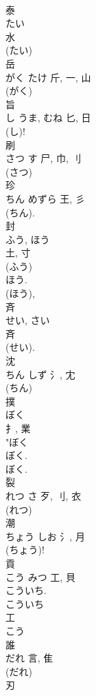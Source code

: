 \documentclass[8pt]{extreport}
\begin{document}
\begin{CJK}{UTF8}{min}
\\	泰	
\\	たい	
\\	水		
\\	(たい) 
\\	岳	
\\	がく	たけ	斤, 一, 山	
\\	(がく) 
\\	旨	
\\	し	うま, むね	匕, 日	
\\	(し)!	
\\	刷	
\\	さつ	す	尸, 巾, 刂	
\\	(さつ) 
\\	珍	
\\	ちん	めずら	王, 彡		
\\	(ちん).	
\\	封	
\\	ふう, ほう	
\\	土, 寸	
\\	(ふう) 
\\	ほう. 
\\	(ほう), 
\\	斉	
\\	せい, さい	
\\	斉	
\\	(せい).	
\\	沈	
\\	ちん	しず	氵, 冘	
\\	(ちん) 
\\	撲	
\\	ぼく	
\\	扌, 業	
\\	"ぼく 
\\	ぼく.
\\	ぼく. 
\\	裂	
\\	れつ	さ	歹, 刂, 衣	
\\	(れつ) 
\\	潮	
\\	ちょう	しお	氵, 月		
\\	(ちょう)!	
\\	貢	
\\	こう	みつ	工, 貝	
\\	こういち.	
\\	こういち 
\\	工 
\\	こう 
\\	誰	
\\	だれ	言, 隹	
\\	(だれ) 
\\	刃	

\end{CJK}
\end{document}
